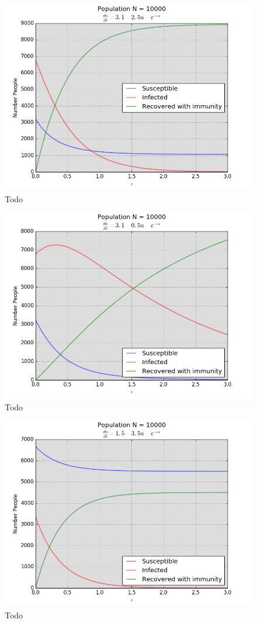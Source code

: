 \documentclass[a4paper]{article}
\begin{document}
\begin{figure}[H]
\centering
\includegraphics[width=1\textwidth]{q7_3.png}
\caption{\label{fig:data}Todo}
\end{figure}
\begin{figure}[H]
\centering
\includegraphics[width=1\textwidth]{q7_4.png}
\caption{\label{fig:data}Todo}
\end{figure}
\begin{figure}[H]
\centering
\includegraphics[width=1\textwidth]{q7_5.png}
\caption{\label{fig:data}Todo}
\end{figure}
\end{document}
